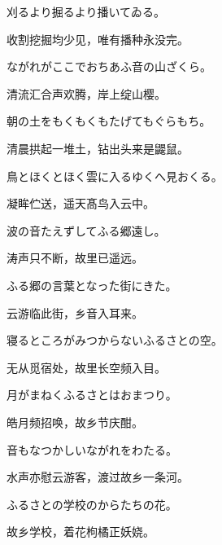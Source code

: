 \begin{haiku}
    {\FH 刈るより掘るより播いてゐる。}

    {\FK 收割挖掘均少见，唯有播种永没完。}
\end{haiku}

\begin{haiku}
    {\FH ながれがここでおちあふ音の山ざくら。}

    {\FK 清流汇合声欢腾，岸上绽山樱。}
\end{haiku}

\begin{haiku}
    {\FH 朝の土をもくもくもたげてもぐらもち。}

    {\FK 清晨拱起一堆土，钻出头来是鼹鼠。}
\end{haiku}

\begin{haiku}
    {\FH 鳥とほくとほく雲に入るゆくへ見おくる。}

    {\FK 凝眸伫送，遥天髙鸟入云中。}
\end{haiku}

\begin{haiku}
    {\FH 波の音たえずしてふる郷遠し。}

    {\FK 涛声只不断，故里已遥远。}
\end{haiku}

\begin{haiku}
    {\FH ふる郷の言葉となった街にきた。}

    {\FK 云游临此街，乡音入耳来。}
\end{haiku}

\begin{haiku}
    {\FH 寝るところがみつからないふるさとの空。}

    {\FK 无从觅宿处，故里长空频入目。}
\end{haiku}

\begin{haiku}
    {\FH 月がまねくふるさとはおまつり。}

    {\FK 皓月频招唤，故乡节庆酣。}
\end{haiku}

\begin{haiku}
    {\FH 音もなつかしいながれをわたる。}

    {\FK 水声亦慰云游客，渡过故乡一条河。}
\end{haiku}

\begin{haiku}
    {\FH ふるさとの学校のからたちの花。}

    {\FK 故乡学校，着花枸橘正妖娆。}
\end{haiku}

